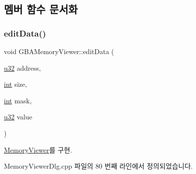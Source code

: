 \subsection{멤버 함수 문서화}
\mbox{\label{class_g_b_a_memory_viewer_a6bfb5ccea3b6f87c3b186149538ad709}} 
\subsubsection{\texorpdfstring{edit\+Data()}{editData()}}
{\footnotesize\ttfamily void G\+B\+A\+Memory\+Viewer\+::edit\+Data (\begin{DoxyParamCaption}\item[{\mbox{\hyperlink{_system_8h_a10e94b422ef0c20dcdec20d31a1f5049}{u32}}}]{address,  }\item[{\mbox{\hyperlink{_util_8cpp_a0ef32aa8672df19503a49fab2d0c8071}{int}}}]{size,  }\item[{\mbox{\hyperlink{_util_8cpp_a0ef32aa8672df19503a49fab2d0c8071}{int}}}]{mask,  }\item[{\mbox{\hyperlink{_system_8h_a10e94b422ef0c20dcdec20d31a1f5049}{u32}}}]{value }\end{DoxyParamCaption})\hspace{0.3cm}{\ttfamily [virtual]}}



\mbox{\hyperlink{class_memory_viewer_a07778cf336e9f145a6403849407fb72d}{Memory\+Viewer}}를 구현.



Memory\+Viewer\+Dlg.\+cpp 파일의 80 번째 라인에서 정의되었습니다.


